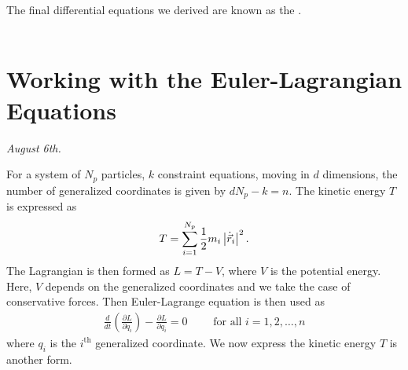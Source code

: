 The final differential equations we derived are known as the .\\ \\

\section{Working with the Euler-Lagrangian Equations}
\textit{August 6th.}

For a system of $N_{p}$ particles, $k$ constraint equations, moving in $d$ dimensions, the number of generalized coordinates is given by $dN_{p}-k = n$. The kinetic energy $T$ is expressed as
\begin{align}
    T = \sum_{i=1}^{N_{p}} \frac{1}{2} m_{i} \left| \dot{\vec{r}}_{i} \right|^{2}.
\end{align}
The Lagrangian is then formed as $L = T-V$, where $V$ is the potential energy. Here, $V$ depends on the generalized coordinates and we take the case of conservative forces. Then Euler-Lagrange equation is then used as
\begin{align}
    \frac{d}{dt} \left( \frac{\partial L}{\partial \dot{q}_{i}} \right) - \frac{\partial L}{\partial q_{i}} = 0 \qquad\text{ for all } i = 1,2,\ldots,n
\end{align}
where $q_{i}$ is the $i^{\text{th}}$ generalized coordinate. We now express the kinetic energy $T$ is another form.\\

